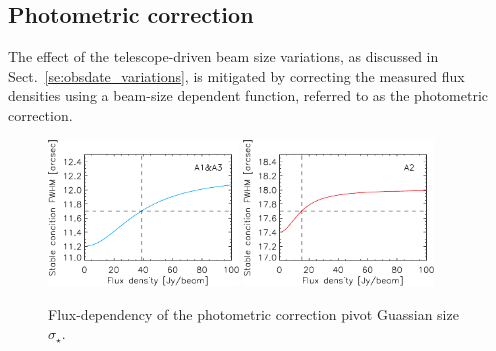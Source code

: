 \subsection{Photometric correction}
\label{se:photometric_correction}

The effect of the telescope-driven beam size variations, as discussed
in Sect.~\ref{se:obsdate_variations}, is mitigated by correcting the measured flux
densities using a beam-size dependent function, referred to as the
photometric correction.

\begin{figure}[ht!]
  \begin{center}
    \includegraphics[clip=true, trim={0, -0.3cm, -0.3cm, 0}, width=0.45\textwidth]{Figures/Photocorr/FWHM_stable_empiric_ref_1mm.pdf}
    \includegraphics[clip=true, trim={0, -0.3cm, -0.3cm, 0}, width=0.45\textwidth]{Figures/Photocorr/FWHM_stable_empiric_ref_a2.pdf}
    \caption[Photometric correction pivot Gaussian
      size]{Flux-dependency of the photometric correction pivot
      Guassian size $\sigma_\star$. }
    \label{fig:sigma_stable_vs_flux}
  \end{center}
\end{figure}


